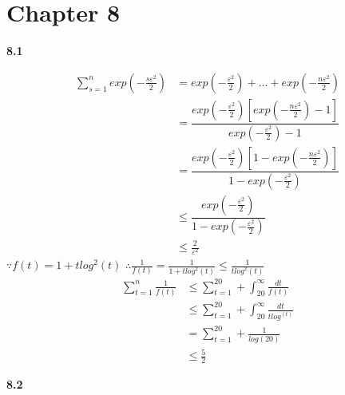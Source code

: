 \chapter*{Chapter 8}
\label{sec:8}

\noindent\textbf{8.1}

    \begin{align*}
    \sum^{n}_{s=1}exp(-\frac{s\varepsilon^2}{2}) &=exp(-\frac{\varepsilon^2}{2})+...+exp(-\frac{n\varepsilon^2}{2})\\
    &=\dfrac{exp(-\frac{\varepsilon^2}{2})[exp(-\frac{n\varepsilon^2}{2})-1]}{exp(-\frac{\varepsilon^2}{2})-1}\\
    &=\dfrac{exp(-\frac{\varepsilon^2}{2})[1-exp(-\frac{n\varepsilon^2}{2})]}{1-exp(-\frac{\varepsilon^2}{2})}\\
    &\le\dfrac{exp(-\frac{\varepsilon^2}{2})}{1-exp(-\frac{\varepsilon^2}{2})}\\
    &\le\frac{2}{\varepsilon^2}
    \end{align*}
    $\because f(t)=1+tlog^2(t)$
    $\therefore \frac{1}{f(t)}=\frac{1}{1+tlog^2(t)}\le\frac{1}{tlog^2(t)}$
    \begin{align*}
    \sum^{n}_{t=1}\frac{1}{f(t)} &\le\sum^{20}_{t=1}+\int^{\infty}_{20}\frac{dt}{f(t)}\\
    &\le\sum^{20}_{t=1}+\int^{\infty}_{20}\frac{dt}{tlog^(t)}\\
    &=\sum^{20}_{t=1}+\frac{1}{log(20)}\\
    &\le\frac{5}{2}
    \end{align*}
    
\noindent\textbf{8.2}

